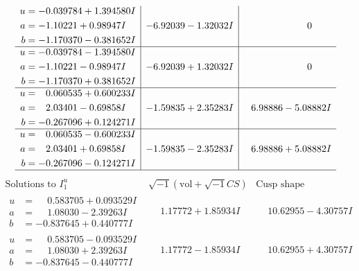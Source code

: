 \documentclass[1p]{elsarticle_modified}
\theoremstyle{definition}
\newcommand{\I}{\sqrt{-1}}
\begin{document}
$$\begin{array}{c|c|c}
\begin{aligned}
u &= -0.039784 + 1.394580 I \\
a &= -1.10221 + 0.98947 I \\
b &= -1.170370 - 0.381652 I\end{aligned}
 & -6.92039 - 1.32032 I & \phantom{-0.000000 } 0 \\ \hline\begin{aligned}
u &= -0.039784 - 1.394580 I \\
a &= -1.10221 - 0.98947 I \\
b &= -1.170370 + 0.381652 I\end{aligned}
 & -6.92039 + 1.32032 I & \phantom{-0.000000 } 0 \\ \hline\begin{aligned}
u &= \phantom{-}0.060535 + 0.600233 I \\
a &= \phantom{-}2.03401 - 0.69858 I \\
b &= -0.267096 + 0.124271 I\end{aligned}
 & -1.59835 + 2.35283 I & \phantom{-}6.98886 - 5.08882 I \\ \hline\begin{aligned}
u &= \phantom{-}0.060535 - 0.600233 I \\
a &= \phantom{-}2.03401 + 0.69858 I \\
b &= -0.267096 - 0.124271 I\end{aligned}
 & -1.59835 - 2.35283 I & \phantom{-}6.98886 + 5.08882 I\\
 \hline 
 \end{array}$$\newpage$$\begin{array}{c|c|c}  
\text{Solutions to }I^u_{1}& \I (\text{vol} + \sqrt{-1}CS) & \text{Cusp shape}\\
 \hline 
\begin{aligned}
u &= \phantom{-}0.583705 + 0.093529 I \\
a &= \phantom{-}1.08030 - 2.39263 I \\
b &= -0.837645 + 0.440777 I\end{aligned}
 & \phantom{-}1.17772 + 1.85934 I & \phantom{-}10.62955 - 4.30757 I \\ \hline\begin{aligned}
u &= \phantom{-}0.583705 - 0.093529 I \\
a &= \phantom{-}1.08030 + 2.39263 I \\
b &= -0.837645 - 0.440777 I\end{aligned}
 & \phantom{-}1.17772 - 1.85934 I & \phantom{-}10.62955 + 4.30757 I \\ \hline\begin{aligned}

\end{aligned}
\end{array}$$
\end{document}
